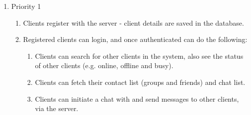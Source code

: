 
\begin{enumerate}
\item Priority 1
\begin{enumerate}[label*=\arabic*.]
\item Clients register with the server - client details are saved in the database. 

\item Registered clients can login, and once authenticated can do the following:
\begin{enumerate}[label*=\arabic*.]
\item Clients can search for other clients in the system, also see the status of other clients (e.g. online, offline and busy).

\item Clients can fetch their contact list (groups and friends) and chat list.

\item Clients can initiate a chat with and send messages to other clients, via the server.


\end{enumerate}
\end{enumerate}
\end{enumerate}
